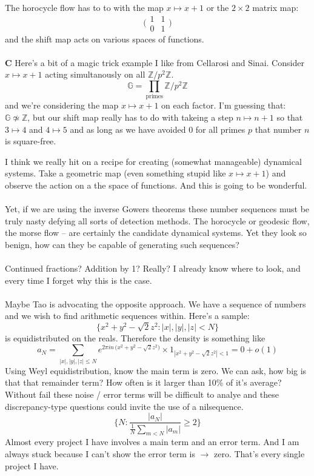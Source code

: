 \documentclass[12pt]{article}
\begin{document}
The horocycle flow has to to with the map $x \mapsto x + 1$ or the $2 \times 2$ matrix map:
$$  \big( \begin{array}{cc}1 & 1 \\ 0 & 1 \end{array}\big)$$
and the shift map acts on various spaces of functions. \\ \\
\textbf{C} Here's a bit of a magic trick example I like from Cellarosi and Sinai.  Consider $x \mapsto x+1$ acting simultanously on all $\mathbb{Z}/p^2 \mathbb{Z}$. 
$$ \mathbb{G} = \prod_{\text{primes}} \mathbb{Z}/p^2 \mathbb{Z} $$
and we're considering the map $x \mapsto x+1$ on each factor.  I'm guessing that: $\mathbb{G} \not \simeq \mathbb{Z}$, but our shift map really has to do with takeing a step $n \mapsto n+1$ so that $3 \mapsto 4$ and $4 \mapsto 5$ and as long as we have avoided $0$ for all primes $p$ that number $n$ is square-free.

\newpage

\noindent I think we really hit on a recipe for creating (somewhat manageable) dynamical systems. Take a geometric map (even something stupid like $x \mapsto x+1$) and observe the action on a the space of functions.  And this is going to be wonderful. \\ \\
Yet, if we are using the inverse Gowers theorems these number sequences must be truly nasty defying all sorts of detection methods.  The horocycle or geodesic flow, the morse flow -- are certainly the candidate dynamical systems. Yet they look so benign, how can they be capable of generating such sequences? \\ \\
Continued fractions?  Addition by 1?  Really?  I already know where to look, and every time I forget why this is the case. \\ \\
Maybe Tao is advocating the opposite approach.  We have a sequence of numbers and we wish to find arithmetic sequences within.  Here's a sample:
$$ \big\{ x^2 + y^2 - \sqrt{2} z^2 : |x|, |y|, |z| < N \big\} $$
is equidistributed on the reals.  Therefore the density is something like
$$ a_N = \sum_{|x|,|y|,|z| \leq N } e^{ 2\pi i n \, \big(x^2 + y^2 - \sqrt{2} z^2\big)  } \times 1_{ |x^2 + y^2 - \sqrt{2} z^2| < 1} =  0 + o(1) $$
Using Weyl equidistribution, know the main term is zero.  We can ask, how big is that that remainder term?  How often is it larger than 10\% of it's average?  Without fail these noise / error terms will be difficult to analye and these discrepancy-type questions could invite the use of a nilsequence.
$$ \bigg\{ N:  \frac{|a_N|}{ \frac{1}{N}\sum_{m < N} |a_m|}  \geq 2\bigg\} $$
Almost every project I have involves a main term and an error term.  And I am always stuck because I can't show the error term is $\to$ zero.  That's every single project I have.
\end{document}
